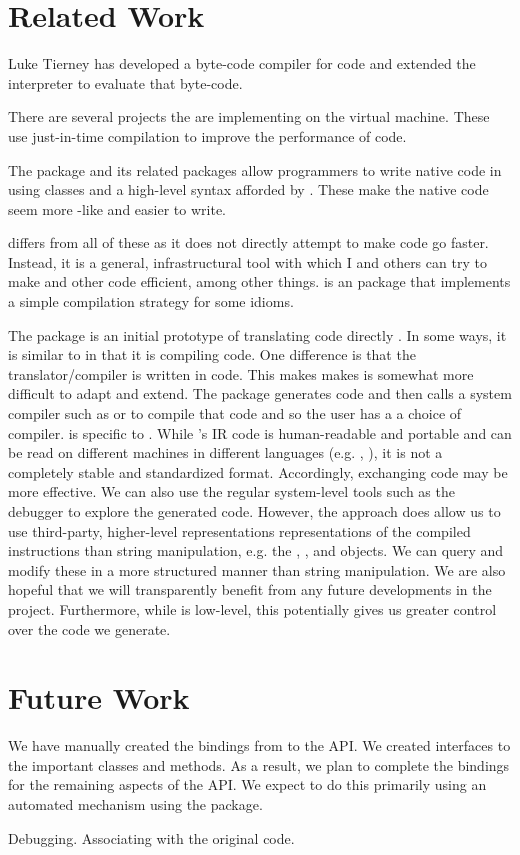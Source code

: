 \documentclass[article]{jss}
\def\RClang{\Rpkg{RCIndex}}
\def\Rllvm{\Rpkg{Rllvm}}
\begin{document}
\section{Related Work}
Luke Tierney has developed a byte-code compiler for \R{} code
and extended the \R{} interpreter to evaluate that byte-code.

There are several projects the are implementing \R{} on the \Java{}
virtual machine.  These use just-in-time compilation to improve the
performance of code.

The  package and its related packages allow \R{}
programmers to write native code in \Cpp{} using classes and a
high-level syntax afforded by \Cpp{}.  These make the native code seem
more \R{}-like and easier to write.

\Rllvm{} differs from all of these as it does not directly attempt to
make \R{} code go faster. Instead, it is a general, infrastructural
tool with which I and others can try to make \R{} and other code
efficient, among other things.  is an \R{} package
that implements a simple compilation strategy for some \R{} idioms.

The  package is an initial prototype of translating \R{}
code directly \C. In some ways, it is similar to  in that
it is compiling \R{} code. One difference is that the
translator/compiler is written in \C{} code.  This makes makes is
somewhat more difficult to adapt and extend.  The package generates
\C{} code and then calls a system compiler such as \gcc{} or \clang{}
to compile that code and so the user has a a choice of compiler.
\Rllvm{} is specific to \llvm{}.  While \llvm's IR code is
human-readable and portable and can be read on different machines in
different languages (e.g. \R, \Python), it is not a completely stable
and standardized format. Accordingly, exchanging \C{} code may be more
effective.  We can also use the regular system-level tools such as the
debugger to explore the generated code.  However, the \Rllvm{}
approach does allow us to use third-party, higher-level
representations representations of the compiled instructions than
string manipulation, e.g. the , ,
 and  objects.  We can query
and modify these in a more structured manner than string manipulation.
We are also hopeful that we will transparently benefit from any future
developments in the \llvm{} project.  Furthermore, while \llvm{} is
low-level, this potentially gives us greater control over the code we
generate.



\section{Future Work}

We have manually created the bindings from \R{} to the \llvm{} API. We
created interfaces to the important classes and methods. As a result,
we plan to complete the bindings for the remaining aspects of the API.
We expect to do this primarily using an automated mechanism using the
\RClang{} package.

Debugging.
Associating with the original code.



\end{document}
